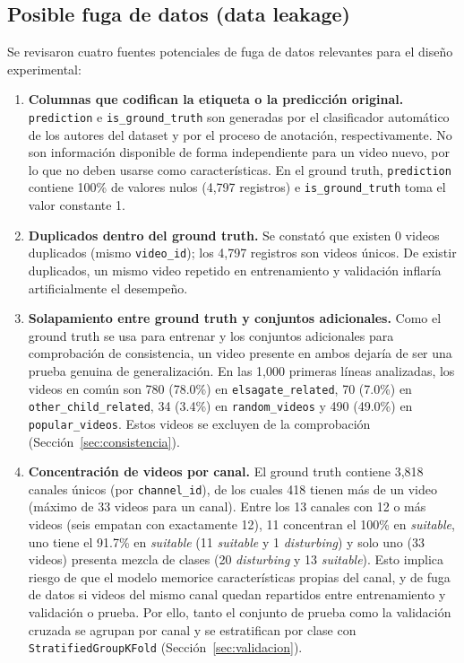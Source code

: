 \documentclass[conference]{IEEEtran}
\begin{document}
\subsection{Posible fuga de datos (data leakage)}\label{sec:leak}
Se revisaron cuatro fuentes potenciales de fuga de datos relevantes para el diseño experimental:
\begin{enumerate}
\item \textbf{Columnas que codifican la etiqueta o la predicción original.} \texttt{prediction} e \texttt{is\_ground\_truth} son generadas por el clasificador automático de los autores del dataset y por el proceso de anotación, respectivamente. No son información disponible de forma independiente para un video nuevo, por lo que no deben usarse como características. En el ground truth, \texttt{prediction} contiene 100\% de valores nulos (4,797 registros) e \texttt{is\_ground\_truth} toma el valor constante 1.
\item \textbf{Duplicados dentro del ground truth.} Se constató que existen 0 videos duplicados (mismo \texttt{video\_id}); los 4,797 registros son videos únicos. De existir duplicados, un mismo video repetido en entrenamiento y validación inflaría artificialmente el desempeño.
\item \textbf{Solapamiento entre ground truth y conjuntos adicionales.} Como el ground truth se usa para entrenar y los conjuntos adicionales para comprobación de consistencia, un video presente en ambos dejaría de ser una prueba genuina de generalización. En las 1,000 primeras líneas analizadas, los videos en común son 780 (78.0\%) en \texttt{elsagate\_related}, 70 (7.0\%) en \texttt{other\_child\_related}, 34 (3.4\%) en \texttt{random\_videos} y 490 (49.0\%) en \texttt{popular\_videos}. Estos videos se excluyen de la comprobación (Sección~\ref{sec:consistencia}).
\item \textbf{Concentración de videos por canal.} El ground truth contiene 3,818 canales únicos (por \texttt{channel\_id}), de los cuales 418 tienen más de un video (máximo de 33 videos para un canal). Entre los 13 canales con 12 o más videos (seis empatan con exactamente 12), 11 concentran el 100\% en \textit{suitable}, uno tiene el 91.7\% en \textit{suitable} (11 \textit{suitable} y 1 \textit{disturbing}) y solo uno (33 videos) presenta mezcla de clases (20 \textit{disturbing} y 13 \textit{suitable}). Esto implica riesgo de que el modelo memorice características propias del canal, y de fuga de datos si videos del mismo canal quedan repartidos entre entrenamiento y validación o prueba. Por ello, tanto el conjunto de prueba como la validación cruzada se agrupan por canal y se estratifican por clase con \texttt{StratifiedGroupKFold} (Sección~\ref{sec:validacion}).
\end{enumerate}
\end{document}
